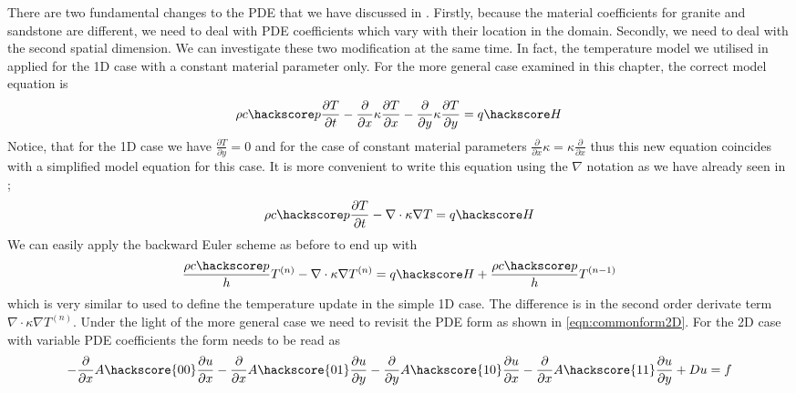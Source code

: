 There are two fundamental changes to the PDE that we have discussed in
. Firstly,
because the material coefficients for granite and sandstone are different, we
need to deal with 
PDE coefficients which vary with their location in the domain. Secondly, we
need 
to deal with the second spatial dimension. We can investigate these two
modification at the same time. 
In fact, the temperature model  we utilised in
 applied for the 
1D case with a constant material parameter only. For the more general case
examined in this chapter, the correct model equation is 
\begin{equation}
\rho c\hackscore p \frac{\partial T}{\partial t} -  \frac{\partial }{\partial x}
\kappa \frac{\partial T}{\partial x} -  \frac{\partial }{\partial y} \kappa
\frac{\partial T}{\partial y} = q\hackscore H 
\label{eqn:hd2}
\end{equation}
Notice, that for the 1D case we have $\frac{\partial T}{\partial y}=0$ and
for the case of constant material parameters $\frac{\partial }{\partial x}
\kappa = \kappa  \frac{\partial }{\partial x}$ thus this new equation coincides
with a simplified model equation for this case. It is more convenient 
to write this equation using the $\nabla$ notation as we have already seen in
;
\begin{equation}\label{eqn:Tform nabla}
\rho c\hackscore p \frac{\partial T}{\partial t} 
-\nabla \cdot \kappa \nabla T = q\hackscore H
\end{equation}
We can easily apply the backward Euler scheme as before to end up with 
\begin{equation}
\frac{\rho c\hackscore p}{h} T^{(n)} -\nabla \cdot \kappa \nabla T^{(n)}  =
q\hackscore H +  \frac{\rho c\hackscore p}{h} T^{(n-1)}
\label{eqn:hdgenf2}
\end{equation}
which is very similar to  used to define the temperature
update in the simple 1D case. 
The difference is in the second order derivate term $\nabla \cdot \kappa \nabla
T^{(n)}$. Under 
the light of the more general case we need to revisit the \esc PDE form as 
shown in \ref{eqn:commonform2D}. For the 2D case with variable PDE coefficients 
the form needs to be read as 
\begin{equation}\label{eqn:commonform2D 2}
-\frac{\partial }{\partial x} A\hackscore{00}\frac{\partial u}{\partial x} 
-\frac{\partial }{\partial x} A\hackscore{01}\frac{\partial u}{\partial y} 
-\frac{\partial }{\partial y} A\hackscore{10}\frac{\partial u}{\partial x} 
-\frac{\partial }{\partial x} A\hackscore{11}\frac{\partial u}{\partial y} 
+ Du = f
\end{equation}

